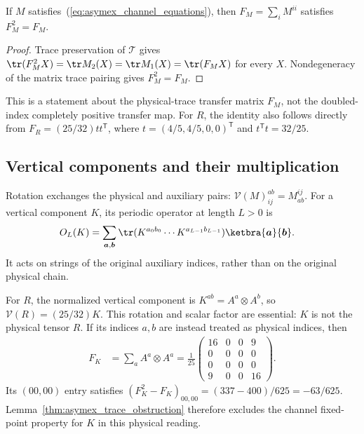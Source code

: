 \begin{lemma}
    \label{thm:asymex_trace_obstruction}
    \leanok
    If $M$ satisfies~(\ref{eq:asymex_channel_equations}), then
    $F_M=\sum_iM^{ii}$ satisfies $F_M^2=F_M$.
\end{lemma}
\begin{proof}
    \leanok
    Trace preservation of $\mathcal T$ gives
    $\tr(F_M^2X)=\tr M_2(X)=\tr M_1(X)=\tr(F_MX)$ for every $X$.
    Nondegeneracy of the matrix trace pairing gives $F_M^2=F_M$.
\end{proof}

This is a statement about the physical-trace transfer matrix $F_M$,
not the doubled-index completely positive transfer map.
For $R$, the identity also follows directly from
$F_R=(25/32)tt^{\mathsf T}$, where
$t=(4/5,4/5,0,0)^{\mathsf T}$ and $t^{\mathsf T}t=32/25$.

\subsection{Vertical components and their multiplication}%
\label{sec:asymex_vertical_dictionary}

Rotation exchanges the physical and auxiliary pairs:
$\mathcal V(M)^{ab}_{ij}=M^{ij}_{ab}$.
For a vertical component $K$, its periodic operator at length $L>0$ is
\begin{align}
    O_L(K)
     & =\sum_{\boldsymbol a,\boldsymbol b}
    \tr(K^{a_0b_0}\cdots K^{a_{L-1}b_{L-1}})
    \ketbra{\boldsymbol a}{\boldsymbol b}.
    \label{eq:asymex_vertical_closure}
\end{align}
It acts on strings of the original auxiliary indices, rather than on
the original physical chain.

For $R$, the normalized vertical component is
$K^{ab}=A^a\otimes A^b$, so
$\mathcal V(R)=(25/32)K$. This rotation and scalar factor are essential:
$K$ is not the physical tensor $R$. If its indices $a,b$ are instead
treated as physical indices, then
\begin{align}
    F_K & =\sum_aA^a\otimes A^a
    =\frac1{25}\begin{pmatrix}
                   16 & 0 & 0 & 9 \\0&0&0&0\\0&0&0&0\\9&0&0&16
               \end{pmatrix}.
    \label{eq:asymex_K_transfer}
\end{align}
Its $(00,00)$ entry satisfies
$(F_K^2-F_K)_{00,00}=(337-400)/625=-63/625$.
Lemma~\ref{thm:asymex_trace_obstruction} therefore excludes the
channel fixed-point property for $K$ in this physical reading.

